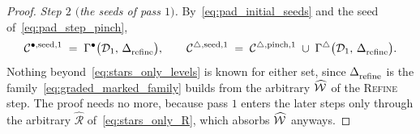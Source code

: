 \documentclass[a4paper, 12pt]{article}
\makeatletter
\newcommand{\collectV}{\Gamma^{\bullet}}                         %
\newcommand{\collectF}{\Gamma^{\triangle}}                       %
\DeclareRobustCommand{\candV}[1][]{\mathcal{C}^{\bullet\ifx\@empty#1\@empty\else,#1\fi}}
\DeclareRobustCommand{\candF}[1][]{\mathcal{C}^{\triangle\ifx\@empty#1\@empty\else,#1\fi}}
\DeclareRobustCommand{\simplexsubsetTwo}[2][]{\Delta\ifx\@empty#1\@empty\else^{#1}\fi_{#2}}
\DeclareRobustCommand{\markedVertexClasses}[1][]{\widehat{\mathcal{W}}\ifx\@empty#1\@empty\else^{#1}\fi}
\newcommand{\R}{\mathcal{R}}
\theoremstyle{definition}
\theoremstyle{plain}
\numberwithin{equation}{section}
\DeclareRobustCommand{\domseq}[1][]{\mathcal{D}\ifx\@empty#1\@empty\else_{#1}\fi}
\makeatother
\begin{document}
\begin{proof}
    \emph{Step $2$ $($the seeds of pass $1)$.} By~\eqref{eq:pad_initial_seeds} and the seed of~\eqref{eq:pad_step_pinch},
    \begin{equation}
        \label{eq:stars_only_seeds_one}
        \candV[\mathrm{seed},1] \; = \; \collectV \big( \domseq[1], \, \simplexsubsetTwo{\mathrm{refine}} \big) ,
        \qquad
        \candF[\mathrm{seed},1] \; = \; \candF[\mathrm{pinch},1] \; \cup \; \collectF \big( \domseq[1], \, \simplexsubsetTwo{\mathrm{refine}} \big) .
    \end{equation}
    Nothing beyond~\eqref{eq:stars_only_levels} is known for either set, since $\simplexsubsetTwo{\mathrm{refine}}$ is the family~\eqref{eq:graded_marked_family} builds from the arbitrary $\markedVertexClasses$ of the \textsc{Refine} step. The proof needs no more, because pass $1$ enters the later steps only through the arbitrary $\widehat{\R}$ of~\eqref{eq:stars_only_R}, which absorbs $\markedVertexClasses$ anyways.


\end{proof}
\end{document}
